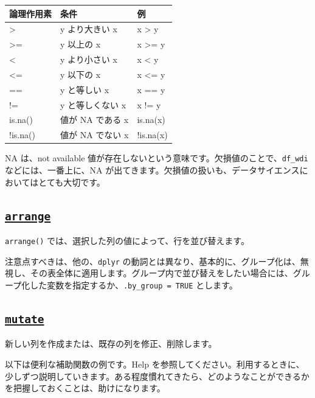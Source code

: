 \documentclass[
  xelatex, ja=standard]{bxjsbook}
\theoremstyle{definition}
\theoremstyle{definition}
\theoremstyle{definition}
\theoremstyle{definition}
\theoremstyle{remark}
\begin{document}
\begin{longtable}[]{@{}lll@{}}
\toprule\noalign{}
論理作用素 & 条件 & 例 \\
\midrule\noalign{}
\endhead
\bottomrule\noalign{}
\endlastfoot
\textgreater{} & y より大きい x & x \textgreater{} y \\
\textgreater= & y 以上の x & x \textgreater= y \\
\textless{} & y より小さい x & x \textless{} y \\
\textless= & y 以下の x & x \textless= y \\
== & y と等しい x & x == y \\
!= & y と等しくない x & x != y \\
is.na() & 値が NA である x & is.na(x) \\
!is.na() & 値が NA でない x & !is.na(x) \\
\end{longtable}

NA は、not available 値が存在しないという意味です。欠損値のことで、\texttt{df\_wdi} などには、一番上に、NA が出てきます。欠損値の扱いも、データサイエンスにおいてはとても大切です。

\hypertarget{arrange}{%
\subsection{\texorpdfstring{\href{https://dplyr.tidyverse.org/reference/arrange.html}{\texttt{arrange}}}{arrange}}\label{arrange}}

\texttt{arrange()} では、選択した列の値によって、行を並び替えます。

注意点すべきは、他の、\texttt{dplyr} の動詞とは異なり、基本的に、グループ化は、無視し、その表全体に適用します。グループ内で並び替えをしたい場合には、グループ化した変数を指定するか、\texttt{.by\_group\ =\ TRUE} とします。

\hypertarget{mutate}{%
\subsection{\texorpdfstring{\href{https://dplyr.tidyverse.org/reference/mutate.html}{\texttt{mutate}}}{mutate}}\label{mutate}}

新しい列を作成または、既存の列を修正、削除します。

以下は便利な補助関数の例です。Help を参照してください。利用するときに、少しずつ説明していきます。ある程度慣れてきたら、どのようなことができるかを把握しておくことは、助けになります。
\end{document}
